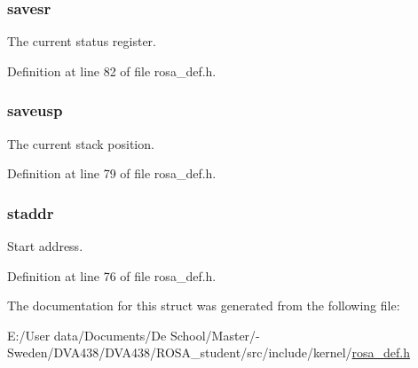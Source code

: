 \subsubsection[{savesr}]{\setlength{\rightskip}{0pt plus 5cm}savesr}\label{structtcb__record__t_a4b57f27f8be80d5cedeb6e3a7a759d18}
The current status register. 

Definition at line 82 of file rosa\+\_\+def.\+h.

\hypertarget{structtcb__record__t_ad2fffaf0f5616d3f34ab2336a25a9186}{}
\subsubsection[{saveusp}]{\setlength{\rightskip}{0pt plus 5cm}saveusp}\label{structtcb__record__t_ad2fffaf0f5616d3f34ab2336a25a9186}
The current stack position. 

Definition at line 79 of file rosa\+\_\+def.\+h.

\hypertarget{structtcb__record__t_a99e7583ffff142dbd9efb8d9c1d8ebde}{}
\subsubsection[{staddr}]{\setlength{\rightskip}{0pt plus 5cm}staddr}\label{structtcb__record__t_a99e7583ffff142dbd9efb8d9c1d8ebde}
Start address. 

Definition at line 76 of file rosa\+\_\+def.\+h.



The documentation for this struct was generated from the following file\+:\begin{DoxyCompactItemize}
\item 
E\+:/\+User data/\+Documents/\+De School/\+Master/-\/ Sweden/\+D\+V\+A438/\+D\+V\+A438/\+R\+O\+S\+A\+\_\+student/src/include/kernel/\hyperlink{rosa__def_8h}{rosa\+\_\+def.\+h}\end{DoxyCompactItemize}
